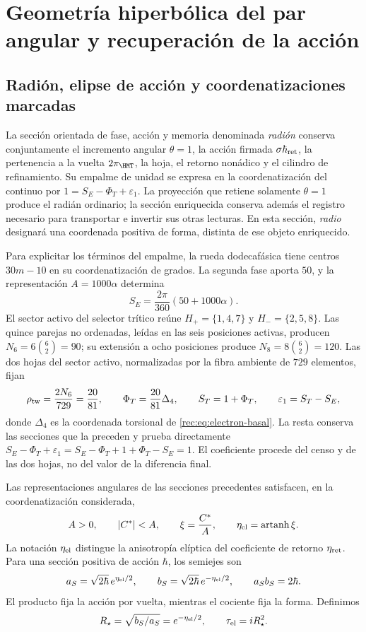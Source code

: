 \section{Geometría hiperbólica del par angular y recuperación de la acción}
\label{rec:radial}

\subsection{Radión, elipse de acción y coordenatizaciones marcadas}

La sección orientada de fase, acción y memoria denominada \emph{radión} conserva conjuntamente el incremento angular \(\theta=1\), la acción firmada \(\sigma\hbar_{\rm ret}\), la pertenencia a la vuelta \(2\pi_{\HMT}\), la hoja, el retorno nonádico y el cilindro de refinamiento. Su empalme de unidad se expresa en la coordenatización del continuo por \(1=S_E-\Phi_T+\varepsilon_1\). La proyección que retiene solamente \(\theta=1\) produce el radián ordinario; la sección enriquecida conserva además el registro necesario para transportar e invertir sus otras lecturas. En esta sección, \emph{radio} designará una coordenada positiva de forma, distinta de ese objeto enriquecido.

Para explicitar los términos del empalme, la rueda dodecafásica tiene centros \(30m-10\) en su coordenatización de grados. La segunda fase aporta \(50\), y la representación \(A=1000\alpha\) determina
\[
 S_E=\frac{2\pi}{360}(50+1000\alpha).
\]
El sector activo del selector trítico reúne \(H_+=\{1,4,7\}\) y \(H_-=\{2,5,8\}\). Las quince parejas no ordenadas, leídas en las seis posiciones activas, producen \(N_6=6\binom62=90\); su extensión a ocho posiciones produce \(N_8=8\binom62=120\). Las dos hojas del sector activo, normalizadas por la fibra ambiente de \(729\) elementos, fijan
\[
 \rho_{\rm tw}=\frac{2N_6}{729}=\frac{20}{81},\qquad
 \Phi_T=\frac{20}{81}\Delta_4,\qquad
 S_T=1+\Phi_T,\qquad \varepsilon_1=S_T-S_E,
\]
donde \(\Delta_4\) es la coordenada torsional de \eqref{rec:eq:electron-basal}. La resta conserva las secciones que la preceden y prueba directamente
\(S_E-\Phi_T+\varepsilon_1=S_E-\Phi_T+1+\Phi_T-S_E=1\).
El coeficiente procede del censo y de las dos hojas, no del valor de la diferencia final.

Las representaciones angulares de las secciones precedentes satisfacen, en la coordenatización considerada,
\[
 A>0,\qquad |C^*|<A,\qquad
 \xi=\frac{C^*}{A},\qquad \eta_{\rm el}=\operatorname{artanh}\xi.
\]
La notación \(\eta_{\rm el}\) distingue la anisotropía elíptica del coeficiente de retorno \(\eta_{\rm ret}\). Para una sección positiva de acción \(\hbar\), los semiejes son
\begin{equation}
 a_S=\sqrt{2\hbar}\,e^{\eta_{\rm el}/2},\qquad
 b_S=\sqrt{2\hbar}\,e^{-\eta_{\rm el}/2},\qquad a_Sb_S=2\hbar.
 \label{rec:eq:elipse}
\end{equation}
El producto fija la acción por vuelta, mientras el cociente fija la forma. Definimos
\[
 R_\star=\sqrt{b_S/a_S}=e^{-\eta_{\rm el}/2},\qquad
 \tau_{\rm el}=iR_\star^2.
\]

